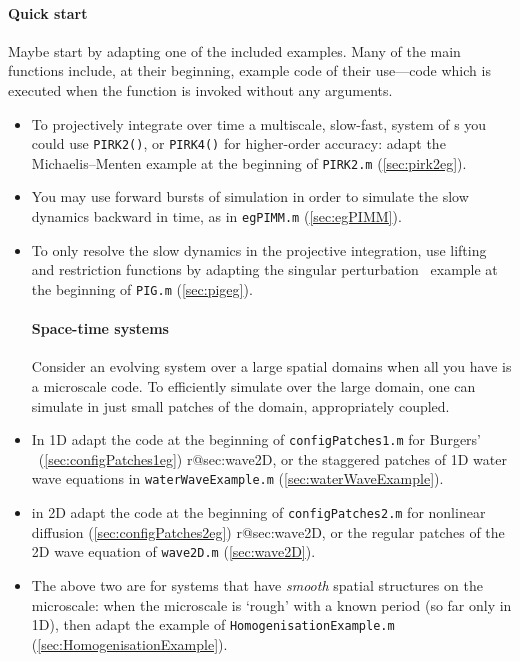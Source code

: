 \paragraph{Quick start}
Maybe start by adapting one of the included examples. 
Many of the main functions include, at their beginning, example code of their use---code which is executed when the function is invoked without any arguments.
\begin{itemize}
\item To projectively integrate over time a multiscale, slow-fast, system of \ode{}s you could use \verb|PIRK2()|, or \verb|PIRK4()| for higher-order accuracy: adapt the Michaelis--Menten example at the beginning of \verb|PIRK2.m| (\cref{sec:pirk2eg}).
\item You may use forward bursts of simulation in order to simulate the slow dynamics backward in time, as in \verb|egPIMM.m| (\cref{sec:egPIMM}).
\item To only resolve the slow dynamics in the projective integration, use lifting and restriction functions by adapting the singular perturbation \ode\ example at the beginning of \verb|PIG.m| (\cref{sec:pigeg}).

\paragraph{Space-time systems}
Consider an evolving system over a large spatial domains when all you have is a microscale code.  
To efficiently simulate over the large domain, one can simulate in just small patches of the domain, appropriately coupled.
\item In 1D adapt the code at the beginning of \verb|configPatches1.m| for Burgers' \pde\ (\cref{sec:configPatches1eg})%
\ifcsname r@sec:wave2D\endcsname, or the staggered patches of 1D water wave equations in \verb|waterWaveExample.m| (\cref{sec:waterWaveExample})\fi.
\item in 2D adapt the code at the beginning of \verb|configPatches2.m| for nonlinear diffusion (\cref{sec:configPatches2eg})%
\ifcsname r@sec:wave2D\endcsname, or the regular patches of the 2D wave equation of \verb|wave2D.m| (\cref{sec:wave2D})\fi.

\item The above two are for systems that have \emph{smooth} spatial structures on the microscale: when the microscale is `rough' with a known period (so far only in 1D), then adapt 
the example of \verb|HomogenisationExample.m| (\cref{sec:HomogenisationExample}).
\end{itemize}


